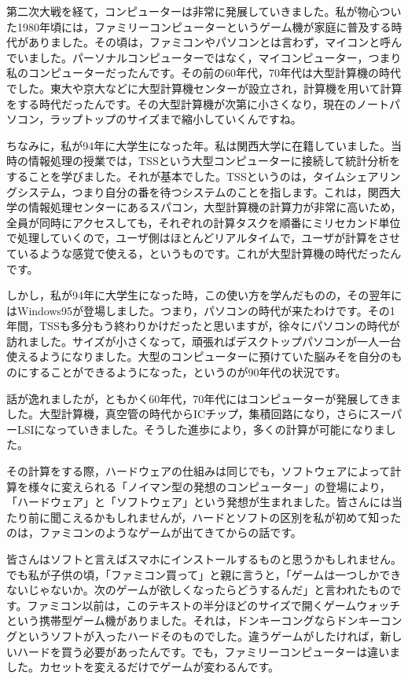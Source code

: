 \documentclass{ltjsbook}
\begin{document}
第二次大戦を経て，コンピューターは非常に発展していきました。私が物心ついた1980年頃には，ファミリーコンピューターというゲーム機が家庭に普及する時代がありました。その頃は，ファミコンやパソコンとは言わず，マイコンと呼んでいました。パーソナルコンピューターではなく，マイコンピューター，つまり私のコンピューターだったんです。その前の60年代，70年代は大型計算機の時代でした。東大や京大などに大型計算機センターが設立され，計算機を用いて計算をする時代だったんです。その大型計算機が次第に小さくなり，現在のノートパソコン，ラップトップのサイズまで縮小していくんですね。

ちなみに，私が94年に大学生になった年。私は関西大学に在籍していました。当時の情報処理の授業では，TSSという大型コンピューターに接続して統計分析をすることを学びました。それが基本でした。TSSというのは，タイムシェアリングシステム，つまり自分の番を待つシステムのことを指します。これは，関西大学の情報処理センターにあるスパコン，大型計算機の計算力が非常に高いため，全員が同時にアクセスしても，それぞれの計算タスクを順番にミリセカンド単位で処理していくので，ユーザ側はほとんどリアルタイムで，ユーザが計算をさせているような感覚で使える，というものです。これが大型計算機の時代だったんです。

しかし，私が94年に大学生になった時，この使い方を学んだものの，その翌年にはWindows95が登場しました。つまり，パソコンの時代が来たわけです。その1年間，TSSも多分もう終わりかけだったと思いますが，徐々にパソコンの時代が訪れました。サイズが小さくなって，頑張ればデスクトップパソコンが一人一台使えるようになりました。大型のコンピューターに預けていた脳みそを自分のものにすることができるようになった，というのが90年代の状況です。

話が逸れましたが，ともかく60年代，70年代にはコンピューターが発展してきました。大型計算機，真空管の時代からICチップ，集積回路になり，さらにスーパーLSIになっていきました。そうした進歩により，多くの計算が可能になりました。

その計算をする際，ハードウェアの仕組みは同じでも，ソフトウェアによって計算を様々に変えられる「ノイマン型の発想のコンピューター」の登場により，「ハードウェア」と「ソフトウェア」という発想が生まれました。皆さんには当たり前に聞こえるかもしれませんが，ハードとソフトの区別を私が初めて知ったのは，ファミコンのようなゲームが出てきてからの話です。

皆さんはソフトと言えばスマホにインストールするものと思うかもしれません。でも私が子供の頃，「ファミコン買って」と親に言うと，「ゲームは一つしかできないじゃないか。次のゲームが欲しくなったらどうするんだ」と言われたものです。ファミコン以前は，このテキストの半分ほどのサイズで開くゲームウォッチという携帯型ゲーム機がありました。それは，ドンキーコングならドンキーコングというソフトが入ったハードそのものでした。違うゲームがしたければ，新しいハードを買う必要があったんです。でも，ファミリーコンピューターは違いました。カセットを変えるだけでゲームが変わるんです。
\end{document}
